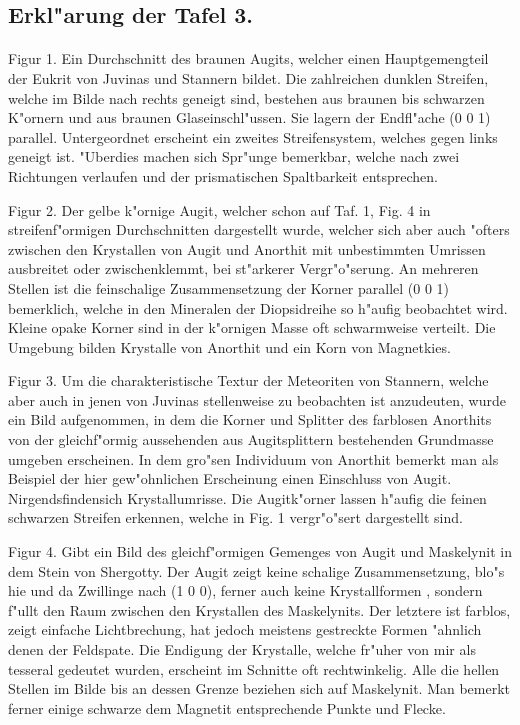 \documentclass[a4paper, 11pt, oneside, polutonikogreek, german]{article}
\begin{document}
\subsection{Erkl"arung der Tafel 3.}
\paragraph{}
Figur 1. Ein Durchschnitt des braunen Augits, welcher einen Hauptgemengteil der Eukrit von Juvinas und Stannern bildet. Die zahlreichen dunklen Streifen, welche im Bilde nach rechts geneigt sind, bestehen aus braunen bis schwarzen K"ornern und aus braunen Glaseinschl"ussen. Sie lagern der Endfl"ache (0 0 1) parallel. Untergeordnet erscheint ein zweites Streifensystem, welches gegen links geneigt ist. "Uberdies machen sich Spr"unge bemerkbar, welche nach zwei Richtungen verlaufen und der prismatischen Spaltbarkeit entsprechen.

Figur 2. Der gelbe k"ornige Augit, welcher schon auf Taf. 1, Fig. 4 in streifenf"ormigen Durchschnitten dargestellt wurde, welcher sich aber auch "ofters zwischen den Krystallen von Augit und Anorthit mit unbestimmten Umrissen ausbreitet oder zwischenklemmt, bei st"arkerer Vergr"o"serung. An mehreren Stellen ist die feinschalige Zusammensetzung der Korner parallel (0 0 1) bemerklich, welche in den Mineralen der Diopsidreihe so h"aufig beobachtet wird. Kleine opake Korner sind in der k"ornigen Masse oft schwarmweise verteilt. Die Umgebung bilden Krystalle von Anorthit und ein Korn von Magnetkies.

Figur 3. Um die charakteristische Textur der Meteoriten von Stannern, welche aber auch in jenen von Juvinas stellenweise zu beobachten ist anzudeuten, wurde ein Bild aufgenommen, in dem die Korner und Splitter des farblosen Anorthits von der gleichf"ormig aussehenden aus Augitsplittern bestehenden Grundmasse umgeben erscheinen. In dem gro"sen Individuum von Anorthit bemerkt man als Beispiel der hier gew"ohnlichen Erscheinung einen Einschluss von Augit. Nirgendsfindensich Krystallumrisse. Die Augitk"orner lassen h"aufig die feinen schwarzen Streifen erkennen, welche in Fig. 1 vergr"o"sert dargestellt sind.

Figur 4. Gibt ein Bild des gleichf"ormigen Gemenges von Augit und Maskelynit in dem Stein von Shergotty. Der Augit zeigt keine schalige Zusammensetzung, blo"s hie und da Zwillinge nach (1 0 0), ferner auch keine Krystallformen , sondern f"ullt den Raum zwischen den Krystallen des Maskelynits. Der letztere ist farblos, zeigt einfache Lichtbrechung, hat jedoch meistens gestreckte Formen "ahnlich denen der Feldspate. Die Endigung der Krystalle, welche fr"uher von mir als tesseral gedeutet wurden, erscheint im Schnitte oft rechtwinkelig. Alle die hellen Stellen im Bilde bis an dessen Grenze beziehen sich auf Maskelynit. Man bemerkt ferner einige schwarze dem Magnetit entsprechende Punkte und Flecke.
\clearpage
\end{document}
